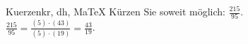 \begin{MAufgabe}{Kuerzen}{kr, dh, MaTeX}
K\"urzen Sie soweit m\"oglich: $\frac{215}{95}$.\\ 
\ifLsg\MLoesung
\quad $\frac{215}{95}=\frac{(5)\cdot(43)}{(5)\cdot(19)}=\frac{43}{19}$.\else\relax\fi
 \end{MAufgabe}